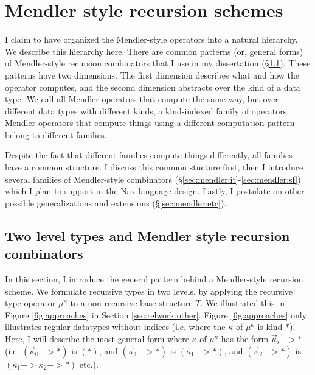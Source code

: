 \section{Mendler style recursion schemes}\label{sec:Mendler} I claim to
have organized the Mendler-style operators into a natural hierarchy. We
describe this hierarchy here. There are common patterns (or, general
forms) of Mendler-style recursion combinators that I use in my
dissertation (\S\ref{sec:mendler:intro}). These patterns have two
dimensions. The first dimension describes what and how the operator
computes, and the second dimension abstracts over the kind of a data
type. We call all Mendler operators that compute the same way, but over
different data types with different kinds,  a kind-indexed family of
operators. Mendler operators that compute things using a different
computation pattern belong to different families.

Despite the fact that different families compute things differently, all
families have a common structure. I discuss this common stucture first,
then I introduce several families of Mendler-style combinators
(\S\ref{sec:mendler:it}-\ref{sec:mendler:sf}) which I plan to support in
the Nax language design. Lastly, I postulate on other possible
generalizations and extensions (\S\ref{sec:mendler:etc}).

\subsection{Two level types and Mendler style recursion combinators}
\label{sec:mendler:intro}
In this section, I introduce the general pattern behind a Mendler-style recursion scheme.
We formulate recursive types in two levels,  by applying the recursive type operator
$\mu^\kappa$ to a non-recursive base structure $T$. 
We illustrated this in Figure \ref{fig:approaches}
in Section \ref{sec:relwork:other}. Figure \ref{fig:approaches}
only illustrates regular datatypes without indices
(i.e. where the $\kappa$ of $\mu^\kappa$ is kind $*$). Here, I will describe
the most general form where $\kappa$ of $\mu^\kappa$ has the form $\vec{\kappa}_i -> *$
(i.e. $(\vec{\kappa}_0 -> *)$ is $(*)$, and  $(\vec{\kappa}_1 -> *)$ is $(\kappa_1 -> *)$, and
$(\vec{\kappa}_2 -> *)$ is  $(\kappa_1 -> \kappa_2 -> *)$ etc.).

